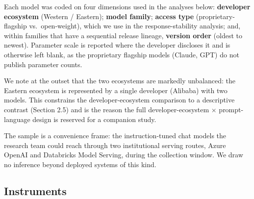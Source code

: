 \documentclass[
]{article}
\begin{document}
Each model was coded on four dimensions used in the analyses below:
\textbf{developer ecosystem} (Western / Eastern); \textbf{model family};
\textbf{access type} (proprietary-flagship vs.~open-weight), which we
use in the response-stability analysis; and, within families that have a
sequential release lineage, \textbf{version order} (oldest to newest).
Parameter scale is reported where the developer discloses it and is
otherwise left blank, as the proprietary flagship models (Claude, GPT)
do not publish parameter counts.

We note at the outset that the two ecosystems are markedly unbalanced:
the Eastern ecosystem is represented by a single developer (Alibaba)
with two models. This constrains the developer-ecosystem comparison to a
descriptive contrast (Section 2.5) and is the reason the full
developer-ecosystem × prompt-language design is reserved for a companion
study.

The sample is a convenience frame: the instruction-tuned chat models the
research team could reach through two institutional serving routes,
Azure OpenAI and Databricks Model Serving, during the collection window.
We draw no inference beyond deployed systems of this kind.

\subsection{Instruments}\label{instruments}
\end{document}

